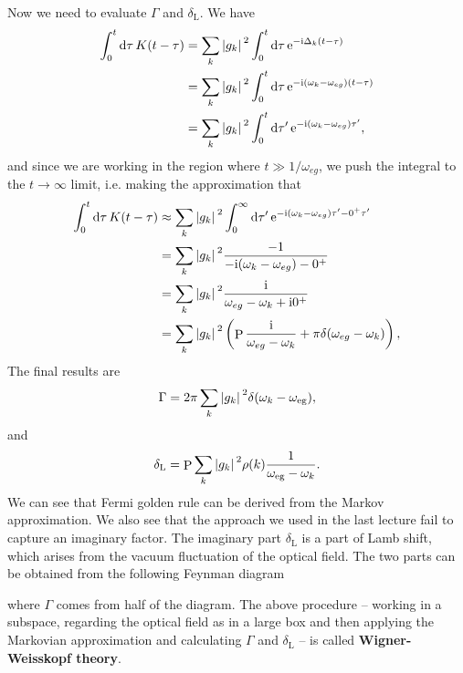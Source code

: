 \documentclass[hyperref, a4paper]{article}
\DeclareMathOperator{\primevalue}{P}
\newcommand*{\ii}{\mathrm{i}}
\newcommand*{\ee}{\mathrm{e}}
\newcommand*{\concept}[1]{{\textbf{#1}}}
\begin{document}
Now we need to evaluate $\Gamma$ and $\delta_\text{L}$. We have 
\[
    \begin{aligned}
        \int_0^t \dd{\tau} K(t - \tau) &= \sum_k \abs*{g_k}^2 \int_0^t \dd{\tau} \ee^{- \ii \Delta_k (t - \tau)} \\
        &= \sum_k \abs*{g_k}^2 \int_0^t \dd{\tau} \ee^{- \ii (\omega_k - \omega_{eg}) (t - \tau)} \\
        &= \sum_k \abs*{g_k}^2 \int_0^t \dd{\tau'} \ee^{- \ii (\omega_k - \omega_{eg}) \tau' },
    \end{aligned}
\]
and since we are working in the region where $t \gg 1 / \omega_{eg}$, we push the integral to the $t \to \infty$ 
limit, i.e. making the approximation that 
\[
    \begin{aligned}
        \int_0^t \dd{\tau} K(t - \tau) &\approx \sum_k \abs*{g_k}^2 \int_0^\infty \dd{\tau'} \ee^{- \ii (\omega_k - \omega_{eg}) \tau' - 0^+ \tau'} \\
        &= \sum_k \abs*{g_k}^2 \frac{-1}{- \ii (\omega_k - \omega_{eg})  - 0^+ } \\
        &= \sum_k \abs*{g_k}^2 \frac{\ii}{\omega_{eg} - \omega_k + \ii 0^+} \\
        &= \sum_k \abs*{g_k}^2 \left( \primevalue \frac{\ii}{\omega_{eg} - \omega_k } + \pi \delta(\omega_{eg} - \omega_k) \right),
    \end{aligned}
\]
The final results are
\begin{equation}
    \Gamma = 2 \pi \sum_k \abs*{g_k}^2 \delta(\omega_k - \omega_\text{eg}),
    \label{eq:scattering-rate}
\end{equation}
and 
\begin{equation}
    \delta_\text{L} = \primevalue \sum_k \abs*{g_k}^2 \rho(k) \frac{1}{\omega_\text{eg} - \omega_k }.
    \label{eq:phase-shift}
\end{equation}
We can see that Fermi golden rule can be derived from the Markov approximation. We also see that the approach 
we used in the last lecture fail to capture an imaginary factor. The imaginary part $\delta_\text{L}$ is a part 
of Lamb shift, which arises from the vacuum fluctuation of the optical field. The two parts can be obtained 
from the following Feynman diagram 

where $\Gamma$ comes from half of the diagram. The above procedure -- working in a subspace, regarding the 
optical field as in a large box and then applying the Markovian approximation and calculating $\Gamma$ and 
$\delta_\text{L}$ -- is called \concept{Wigner-Weisskopf theory}.
\end{document}
